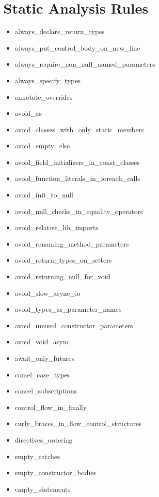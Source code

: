 \chapter{Static Analysis Rules} \label{app:linter-rules}

\begin{itemize}
    \item always\_declare\_return\_types
    \item always\_put\_control\_body\_on\_new\_line
    \item always\_require\_non\_null\_named\_parameters
    \item always\_specify\_types
    \item annotate\_overrides
    \item avoid\_as
    \item avoid\_classes\_with\_only\_static\_members
    \item avoid\_empty\_else
    \item avoid\_field\_initializers\_in\_const\_classes
    \item avoid\_function\_literals\_in\_foreach\_calls
    \item avoid\_init\_to\_null
    \item avoid\_null\_checks\_in\_equality\_operators
    \item avoid\_relative\_lib\_imports
    \item avoid\_renaming\_method\_parameters
    \item avoid\_return\_types\_on\_setters
    \item avoid\_returning\_null\_for\_void
    \item avoid\_slow\_async\_io
    \item avoid\_types\_as\_parameter\_names
    \item avoid\_unused\_constructor\_parameters
    \item avoid\_void\_async
    \item await\_only\_futures
    \item camel\_case\_types
    \item cancel\_subscriptions
    \item control\_flow\_in\_finally
    \item curly\_braces\_in\_flow\_control\_structures
    \item directives\_ordering
    \item empty\_catches
    \item empty\_constructor\_bodies
    \item empty\_statements

\end{itemize}
